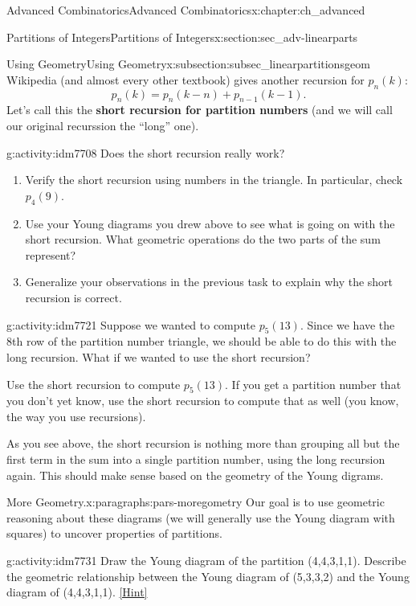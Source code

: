 \documentclass[oneside,10pt,]{book}
\newcommand{\terminology}[1]{\textbf{#1}}
\numberwithin{equation}{chapter}
\begin{document}
\begin{chapterptx}{Advanced Combinatorics}{}{Advanced Combinatorics}{}{}{x:chapter:ch_advanced}
\begin{sectionptx}{Partitions of Integers}{}{Partitions of Integers}{}{}{x:section:sec_adv-linearparts}
\begin{subsectionptx}{Using Geometry}{}{Using Geometry}{}{}{x:subsection:subsec_linearpartitionsgeom}
Wikipedia (and almost every other textbook) gives another recursion for \(p_n(k)\):%
\begin{equation*}
p_n(k) = p_n(k-n) + p_{n-1}(k-1)\text{.}
\end{equation*}
Let's call this the \terminology{short recursion for partition numbers} (and we will call our original recurssion the ``long'' one).%
\begin{activity}{}{g:activity:idm7708}%
Does the short recursion really work?%
\begin{enumerate}[font=\bfseries,label=(\alph*),ref=\alph*]
\item{}Verify the short recursion using numbers in the triangle.  In particular, check \(p_4(9)\).%
\item{}Use your Young diagrams you drew above to see what is going on with the short recursion.  What geometric operations do the two parts of the sum represent?%
\item{}Generalize your observations in the previous task to explain why the short recursion is correct.%
\end{enumerate}
\end{activity}
\begin{activity}{}{g:activity:idm7721}%
Suppose we wanted to compute \(p_5(13)\).  Since we have the 8th row of the partition number triangle, we should be able to do this with the long recursion.  What if we wanted to use the short recursion?%
\par
Use the short recursion to compute \(p_5(13)\).  If you get a partition number that you don't yet know, use the short recursion to compute that as well (you know, the way you use recursions).%
\end{activity}
As you see above, the short recursion is nothing more than grouping all but the first term in the sum into a single partition number, using the long recursion again.  This should make sense based on the geometry of the Young digrams.%
\begin{paragraphs}{More Geometry.}{x:paragraphs:pars-moregometry}%
Our goal is to use geometric reasoning about these diagrams (we will generally use the Young diagram with squares) to uncover properties of partitions.%
\begin{activity}{}{g:activity:idm7731}%
Draw the Young diagram of the partition (4,4,3,1,1). Describe the geometric relationship between the Young diagram of (5,3,3,2) and the Young diagram of (4,4,3,1,1).%
\space\hspace*{0pt}\hfill{\tiny\hyperlink{g:hint:idm7734-back}{[Hint]}}\end{activity}

\end{paragraphs}
\end{subsectionptx}
\end{sectionptx}
\end{chapterptx}
\end{document}
